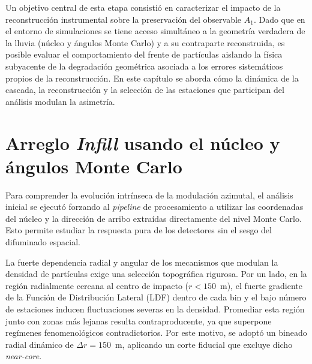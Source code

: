 Un objetivo central de esta etapa consistió en caracterizar el impacto de la reconstrucción instrumental sobre la preservación del observable $A_1$. Dado que en el entorno de simulaciones se tiene acceso simultáneo a la geometría verdadera de la lluvia (núcleo y ángulos Monte Carlo) y a su contraparte reconstruida, es posible evaluar el comportamiento del frente de partículas aislando la física subyacente {\color{blue}de la degradación geométrica asociada a los errores sistemáticos propios de la reconstrucción. En este capítulo se aborda cómo la dinámica de la cascada, la reconstrucción y la selección de las estaciones que participan del análisis modulan la asimetría.}

\section{Arreglo \textit{Infill} usando el núcleo y ángulos Monte Carlo}
\label{subsec:infill_mc}

Para comprender la evolución intrínseca de la modulación azimutal, el análisis inicial se ejecutó forzando al \textit{pipeline} de procesamiento a utilizar las coordenadas del núcleo y la dirección de arribo extraídas directamente del nivel Monte Carlo. Esto permite estudiar la respuesta pura de los detectores sin el sesgo del difuminado espacial.

La fuerte dependencia radial y angular de los mecanismos que modulan la densidad de partículas exige una selección topográfica rigurosa. %
Por un lado, en la región radialmente cercana al centro de impacto ($r < 150$~m), {\color{blue}el fuerte gradiente de la Función de Distribución Lateral (LDF) dentro de cada bin y el bajo número de estaciones inducen fluctuaciones severas en la densidad.} Promediar esta región junto con zonas más lejanas resulta contraproducente, ya que superpone regímenes fenomenológicos contradictorios. Por este motivo, se adoptó un bineado radial dinámico de $\Delta r = 150$~m, aplicando un corte fiducial que excluye dicho \textit{near-core}. 

